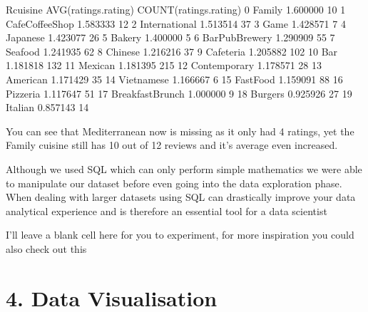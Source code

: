 \documentclass[letterpaper,10pt,english]{jupyterBook}
\begin{document}
\begin{sphinxVerbatim}[commandchars=\\\{\}]
            Rcuisine  AVG(ratings.rating)  COUNT(ratings.rating)
0             Family             1.600000                     10
1   Cafe\PYGZhy{}Coffee\PYGZus{}Shop             1.583333                     12
2      International             1.513514                     37
3               Game             1.428571                      7
4           Japanese             1.423077                     26
5             Bakery             1.400000                      5
6    Bar\PYGZus{}Pub\PYGZus{}Brewery             1.290909                     55
7            Seafood             1.241935                     62
8            Chinese             1.216216                     37
9          Cafeteria             1.205882                    102
10               Bar             1.181818                    132
11           Mexican             1.181395                    215
12      Contemporary             1.178571                     28
13          American             1.171429                     35
14        Vietnamese             1.166667                      6
15         Fast\PYGZus{}Food             1.159091                     88
16          Pizzeria             1.117647                     51
17  Breakfast\PYGZhy{}Brunch             1.000000                      9
18           Burgers             0.925926                     27
19           Italian             0.857143                     14
\end{sphinxVerbatim}

\sphinxAtStartPar
You can see that Mediterranean now is missing as it only had 4 ratings, yet the Family cuisine still has 10 out of 12 reviews and it’s average even increased.

\sphinxAtStartPar
Although we used SQL which can only perform simple mathematics we were able to manipulate our dataset before even going into the data exploration phase.
When dealing with larger datasets using SQL can drastically improve your data analytical experience and is therefore an essential tool for a data scientist

\sphinxAtStartPar
I’ll leave a blank cell here for you to experiment, for more inspiration you could also check out this 


\part{4. Data Visualisation}
\end{document}
